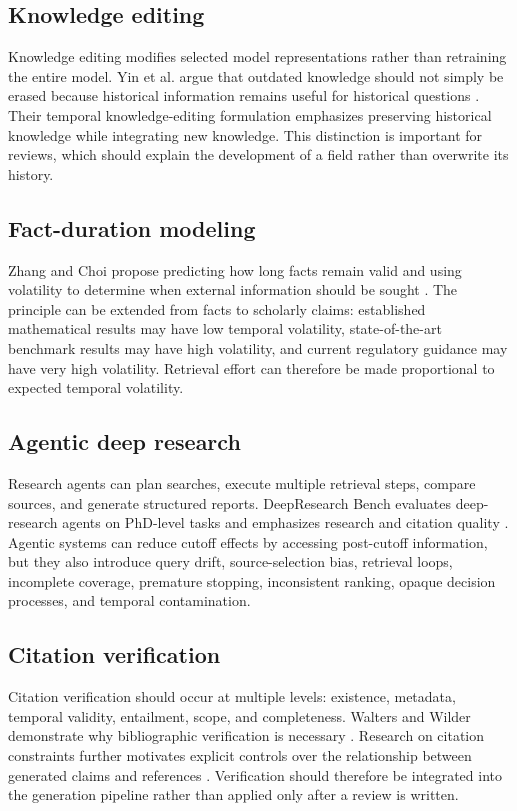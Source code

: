 \documentclass[manuscript,screen]{acmart}
\begin{document}
\subsection{Knowledge editing}\label{subsec:editing}
Knowledge editing modifies selected model representations rather than retraining the entire model. Yin et al.
argue that outdated knowledge should not simply be erased because historical information remains useful for
historical questions \cite{yin2024}. Their temporal knowledge-editing formulation emphasizes preserving
historical knowledge while integrating new knowledge. This distinction is important for reviews, which should
explain the development of a field rather than overwrite its history.

\subsection{Fact-duration modeling}\label{subsec:duration}
Zhang and Choi propose predicting how long facts remain valid and using volatility to determine when external
information should be sought \cite{zhang2023}. The principle can be extended from facts to scholarly claims:
established mathematical results may have low temporal volatility, state-of-the-art benchmark results may have
high volatility, and current regulatory guidance may have very high volatility. Retrieval effort can therefore be
made proportional to expected temporal volatility.

\subsection{Agentic deep research}\label{subsec:agents}
Research agents can plan searches, execute multiple retrieval steps, compare sources, and generate structured
reports. DeepResearch Bench evaluates deep-research agents on PhD-level tasks and emphasizes research and
citation quality \cite{du2025}. Agentic systems can reduce cutoff effects by accessing post-cutoff information,
but they also introduce query drift, source-selection bias, retrieval loops, incomplete coverage, premature
stopping, inconsistent ranking, opaque decision processes, and temporal contamination.

\subsection{Citation verification}\label{subsec:verification}
Citation verification should occur at multiple levels: existence, metadata, temporal validity, entailment,
scope, and completeness. Walters and Wilder demonstrate why bibliographic verification is necessary
\cite{walters2023}. Research on citation constraints further motivates explicit controls over the relationship
between generated claims and references \cite{davis2026}. Verification should therefore be integrated into
the generation pipeline rather than applied only after a review is written.
\end{document}
